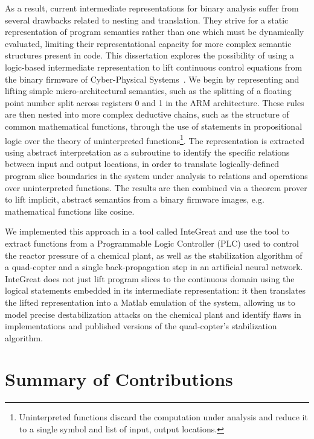 As a result, current intermediate representations for binary analysis suffer from several drawbacks related to nesting and translation.
They strive for a static representation of program semantics rather than one which must be dynamically evaluated, limiting their representational capacity for more complex semantic structures present in code.
This dissertation explores the possibility of using a logic-based intermediate representation to lift continuous control equations from the binary firmware of Cyber-Physical Systems~\cite{letichevsky2017cyber}.
We begin by representing and lifting simple micro-architectural semantics, such as the splitting of a floating point number split across registers 0 and 1 in the ARM architecture.
These rules are then nested into more complex deductive chains, such as the structure of common mathematical functions, through the use of statements in propositional logic over the theory of uninterpreted functions\footnote{Uninterpreted functions discard the computation under analysis and reduce it to a single symbol and list of input, output locations.}.
The representation is extracted using abstract interpretation as a subroutine to identify the specific relations between input and output locations, in order to translate logically-defined program slice boundaries in the system under analysis to relations and operations over uninterpreted functions.
The results are then combined via a theorem prover to lift implicit, abstract semantics from a binary firmware images, e.g. mathematical functions like cosine.

We implemented this approach in a tool called InteGreat and use the tool to extract functions from a Programmable Logic Controller (PLC) used to control the reactor pressure of a chemical plant, as well as the stabilization algorithm of a quad-copter and a single back-propagation step in an artificial neural network.
InteGreat does not just lift program slices to the continuous domain using the logical statements embedded in its intermediate representation: it then translates the lifted representation into a Matlab emulation of the system, allowing us to model precise destabilization attacks on the chemical plant and identify flaws in implementations and published versions of the quad-copter's stabilization algorithm.

\section{Summary of Contributions}

